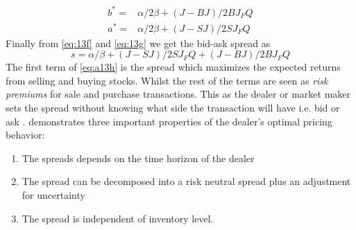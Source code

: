 \documentclass{kththesis}
\theoremstyle{definition}
\begin{document}
\begin{align}
\label{eq:a13f}
    b^{*} = & \alpha/2\beta + (J-BJ)/2BJ_{F}Q \\
    a^{*} = & \alpha/2\beta + (J-SJ)/2SJ_{F}Q \label{eq:a13g}
\end{align}
Finally from \autoref{eq:13f} and \autoref{eq:13g} we get the bid-ask spread as
\begin{equation}
    \label{eq:a13h}
    s = \alpha / \beta + (J-SJ)/2SJ_{F}Q + (J-BJ)/2BJ_{F}Q
\end{equation}
The first term of \autoref{eq:a13h} is the spread which maximizes the expected returns from selling and buying stocks. Whilst the rest of the terms are seen as \textit{risk premiums} for sale and purchase transactions. This as the dealer or market maker sets the spread without knowing what side the transaction will have i.e. bid or ask \parencite{ho1981optimal}.
\newline
\newline
\textcite{ho1981optimal} demonstrates three important properties of the dealer's optimal pricing behavior:

\begin{enumerate}
    \item The spreads depends on the time horizon of the dealer
    \item The spread can be decomposed into a risk neutral spread plus an adjustment for uncertainty
    \item The spread is independent of inventory level.
\end{enumerate}
\end{document}
